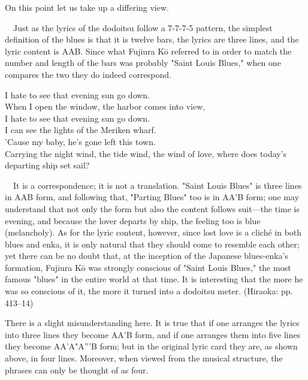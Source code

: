 On this point let us take up a differing view.

\begin{gquote}
　Just as the lyrics of the dodoitsu follow a 7-7-7-5 pattern, the simplest definition of the blues is that it is twelve bars, the lyrics are three lines, and the lyric content is AAB. Since what Fujiura Kō referred to in order to match the number and length of the bars was probably "Saint Louis Blues," when one compares the two they do indeed correspond.
\end{gquote}

\begin{verseblock}
I hate to see that evening sun go down.\\
When I open the window, the harbor comes into view,\\
I hate to see that evening sun go down.\\
I can see the lights of the Meriken wharf.\\
'Cause my baby, he's gone left this town.\\
Carrying the night wind, the tide wind, the wind of love, where does today's departing ship set sail?
\end{verseblock}

\begin{gquote}
　It is a correspondence; it is not a translation. "Saint Louis Blues" is three lines in AAB form, and following that, "Parting Blues" too is in AA'B form; one may understand that not only the form but also the content follows suit—the time is evening, and because the lover departs by ship, the feeling too is blue (melancholy). As for the lyric content, however, since lost love is a cliché in both blues and enka, it is only natural that they should come to resemble each other; yet there can be no doubt that, at the inception of the Japanese blues-enka's formation, Fujiura Kō was strongly conscious of "Saint Louis Blues," the most famous "blues" in the entire world at that time. It is interesting that the more he was so conscious of it, the more it turned into a dodoitsu meter. (Hiraoka: pp. 413–14)
\end{gquote}

There is a slight misunderstanding here. It is true that if one arranges the lyrics into three lines they become AA'B form, and if one arranges them into five lines they become AA'A"A'''B form; but in the original lyric card they are, as shown above, in four lines. Moreover, when viewed from the musical structure, the phrases can only be thought of as four.

